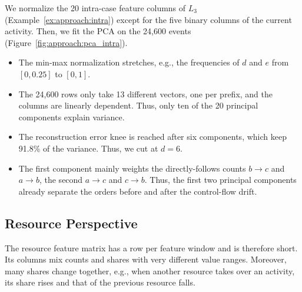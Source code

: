 \begin{example}
	\label{ex:approach:reduction_intra}
	We normalize the 20 intra-case feature columns of $L_3$ (Example~\ref{ex:approach:intra}) except for the five binary columns of the current activity. Then, we fit the PCA on the 24,600 events (Figure~\ref{fig:approach:pca_intra}).
	\begin{itemize}
		\item The min-max normalization stretches, e.g., the frequencies of $d$ and $e$ from $[0, 0.25]$ to $[0, 1]$.

		\item The 24,600 rows only take 13 different vectors, one per prefix, and the columns are linearly dependent. Thus, only ten of the 20 principal components explain variance.

		\item The reconstruction error knee is reached after six components, which keep 91.8\% of the variance. Thus, we cut at $d = 6$.

		\item The first component mainly weights the directly-follows counts $b \to c$ and $a \to b$, the second $a \to c$ and $c \to b$. Thus, the first two principal components already separate the orders before and after the control-flow drift.
	\end{itemize}
\end{example}

\subsection{Resource Perspective}
\label{sec:approach:reduction:resource}
The resource feature matrix has a row per feature window and is therefore short. Its columns mix counts and shares with very different value ranges. Moreover, many shares change together, e.g., when another resource takes over an activity, its share rises and that of the previous resource falls.

